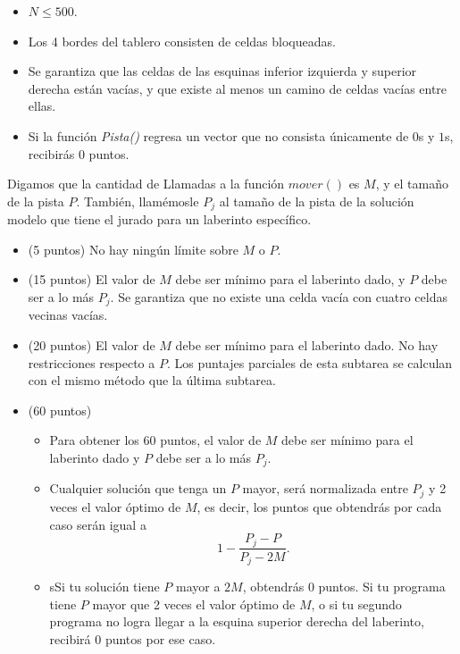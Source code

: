 \documentclass[12pt]{scrartcl}
\begin{document}
        \begin{itemize}
            \item $N \le 500$.
            \item Los 4 bordes del tablero consisten de celdas bloqueadas.
            \item Se garantiza que las celdas de las esquinas inferior izquierda y superior derecha están vacías, y que existe al menos un camino de celdas vacías entre ellas.
            \item Si la función \textit{Pista()} regresa un vector que no consista únicamente de $0$s y $1$s, recibirás 0 puntos.
        \end{itemize}
        

    Digamos que la cantidad de Llamadas a la función $mover()$ es $M$, y el tamaño de la pista $P$.
    También, llamémosle $P_j$ al tamaño de la pista de la solución modelo que tiene el jurado para un laberinto específico. 

    \begin{itemize}
        \item (5 puntos) No hay ningún límite sobre $M$ o $P$.
        \item (15 puntos) El valor de $M$ debe ser mínimo para el laberinto dado, y $P$ debe ser a lo más $P_j$. Se garantiza que no existe una celda vacía con cuatro celdas vecinas vacías.
        \item (20 puntos) El valor de $M$ debe ser mínimo para el laberinto dado. No hay restricciones respecto a $P$.
        Los puntajes parciales de esta subtarea se calculan con el mismo método que la última subtarea.
        \item (60 puntos) 
        \begin{itemize}
            \item Para obtener los 60 puntos, el valor de $M$ debe ser mínimo para el laberinto dado y $P$ debe ser a lo más  $P_j$.
            \item Cualquier solución que tenga un $P$ mayor, será normalizada entre $P_j$ y 2 veces el valor óptimo de $M$, es decir, los puntos que obtendrás por cada caso serán igual a
            \[1 - \frac{P_j - P}{P_j - 2M}.\]
            \item sSi tu solución tiene $P$ mayor a $2M$, obtendrás 0 puntos.
             Si tu programa tiene $P$ mayor que 2 veces el valor óptimo de $M$, o si tu segundo programa no logra llegar a la esquina superior derecha del laberinto, recibirá 0 puntos por ese caso.
        \end{itemize}
    \end{itemize}
\end{document}
